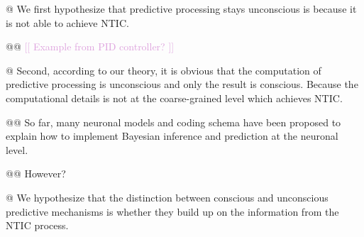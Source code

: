 \documentclass[utf8]{article}
\newenvironment{ants}
			{
			 \begin{easylist}[itemize]		
		 	}
			{
			\end{easylist}
			}
\newcommand{\idea}[2][Plum]{\noindent
				\textcolor{#1}{[[ #2 ]]}}
\begin{document}
\begin{ants}
				
				
				
				
				@ We first hypothesize that predictive processing stays unconscious is because it is not able to achieve NTIC. 
				
					@@ \idea{Example from PID controller?}
					
				@ Second, according to our theory, it is obvious that the computation of predictive processing is unconscious and only the result is conscious. Because the computational details is not at the coarse-grained level which achieves NTIC. 
				
					@@ So far, many neuronal models and coding schema have been proposed to explain how to implement Bayesian inference and prediction at the neuronal level.  
					
					@@ However?
				
				
				@ We hypothesize that the distinction between conscious and unconscious predictive mechanisms is whether they build up on the information from the NTIC process. 
				
				
				
				
				 
			\end{ants}
		
		
		
\end{document}
